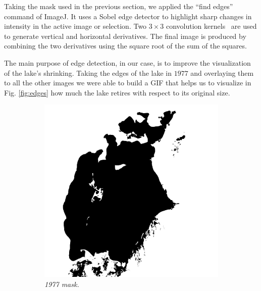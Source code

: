 Taking the mask used in the previous section, we applied the “find edges” command of ImageJ. 
It uses a Sobel edge detector to highlight sharp changes in intensity in the active image or selection. 
Two $3 \times 3$ convolution kernels~\cite{edges} are used to generate vertical and horizontal derivatives.
The final image is produced by combining the two derivatives using the square root of the sum of the squares.

The main purpose of edge detection, in our case, is to improve the visualization of the lake's shrinking. 
Taking the edges of the lake in $1977$ and overlaying them to all the other images we were able to build a GIF that helps us to visualize in Fig. \ref{fig:edges} how much the lake retires with respect to its original size.
\begin{figure}[H]
    \centering
    \begin{subfigure}[b]{.45\textwidth}
        \includegraphics[width=\textwidth]{../img/mask.jpg}
        \caption{\emph{1977 mask.}}
    \end{subfigure}
    \begin{subfigure}[b]{.45\textwidth}

\end{subfigure}
\end{figure}
